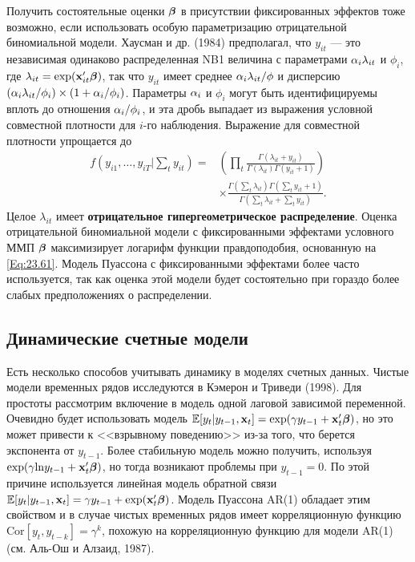 Получить состоятельные оценки $\bm{\beta}$ в присутствии фиксированных эффектов тоже возможно, если использовать особую параметризацию отрицательной биномиальной модели. Хаусман и др. (1984) предполагал, что $y_{it}$ --- это независимая одинаково распределенная NB1 величина с параметрами $\alpha_i \lambda_{it}$ и $\phi_i$, где $\lambda_{it}=\exp (\mathbf{x}'_{it}\bm{\beta})$, так что $y_{it}$ имеет среднее $\alpha_i \lambda_{it} / \phi$ и дисперсию $(\alpha_i \lambda_{it}/\phi_i) \times (1+\alpha_i /\phi_i)$. Параметры $\alpha_i$ и $\phi_i$ могут быть идентифицируемы вплоть до отношения $\alpha_i/\phi_i$, и эта дробь выпадает из выражения условной совместной плотности для $i$-го наблюдения. Выражение для совместной плотности упрощается до 
\begin{align}
f(y_{i1}, \dots, y_{iT} | \sum_t y_{it})=
& \left( \prod_t \frac{\Gamma(\lambda_{it}+y_{it})}{\Gamma(\lambda_{it}) \Gamma (y_{it} + 1)} \right) 
\label{Eq:23.61} \\
& \times \frac{\Gamma (\sum_t \lambda_{it}) \Gamma (\sum_t y_{it} + 1)}{\Gamma(\sum_t \lambda_{it}+\sum_t y_{it})}.
\nonumber
\end{align}
Целое $\lambda_{it}$  имеет \textbf{отрицательное гипергеометрическое распределение}. Оценка отрицательной биномиальной модели с фиксированными эффектами условного ММП $\bm{\beta}$ максимизирует логарифм функции  правдоподобия, основанную на \ref{Eq:23.61}. Модель Пуассона с фиксированными эффектами более часто используется, так как оценка этой модели будет состоятельно при гораздо более слабых предположениях о распределении.  


\subsection{Динамические счетные модели}


Есть несколько способов учитывать динамику в моделях счетных данных. Чистые модели временных рядов исследуются в Кэмерон и Триведи (1998). Для простоты рассмотрим включение в модель одной лаговой зависимой переменной. Очевидно будет использовать модель $\mathbb{E} [y_t| y_{t-1}, \mathbf{x}_t]=\exp (\gamma y_{t-1}+\mathbf{x}'_t\bm{\beta})$, но это может привести к <<взрывному поведению>> из-за того, что берется экспонента от $y_{t-1}$. Более стабильную модель можно получить, используя $\exp (\gamma \mathrm{ln} y_{t-1} + \mathbf{x}'_t \bm{\beta})$, но тогда возникают проблемы при $y_{t-1}=0$. По этой причине используется линейная модель обратной связи $\mathbb{E} [y_t|y_{t-1}, \mathbf{x}_t]=\gamma y_{t-1}+\exp (\mathbf{x}'_t\bm{\beta})$. Модель Пуассона AR(1) обладает этим свойством и в случае чистых временных рядов имеет корреляционную функцию $\mathrm{Cor}[y_t, y_{t-k}]=\gamma^k$, похожую на корреляционную функцию для модели AR(1) (см. Аль-Ош и Алзаид, 1987).


